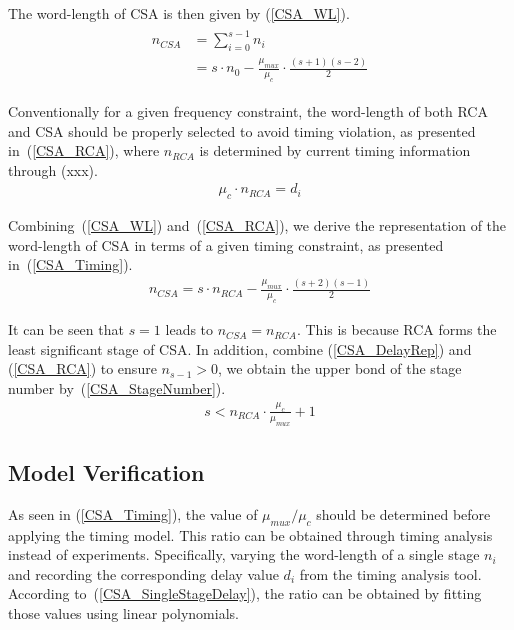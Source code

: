 \documentclass[journal]{IEEEtran}
\begin{document}
The word-length of CSA is then given by (\ref{CSA_WL}).
\begin{eqnarray}\label{CSA_WL}
  \begin{split}
    n_{CSA} &=\sum_{i=0}^{s-1}n_{i} \\
    &= s\cdot n_{0}-\frac{\mu_{mux}}{\mu_{c}}\cdot\frac{(s+1)(s-2)}{2}
  \end{split}
\end{eqnarray}

Conventionally for a given frequency constraint, the word-length of both RCA and CSA should be properly selected to avoid timing violation, as presented in~(\ref{CSA_RCA}), where $n_{RCA}$ is determined by current timing information through (xxx).
\begin{eqnarray}\label{CSA_RCA}
  \mu_{c}\cdot n_{RCA}=d_i
\end{eqnarray}

Combining~(\ref{CSA_WL}) and~(\ref{CSA_RCA}), we derive the representation of the word-length of CSA in terms of a given timing constraint, as presented in~(\ref{CSA_Timing}).
\begin{eqnarray}\label{CSA_Timing}
  n_{CSA}=s\cdot n_{RCA}-\frac{\mu_{mux}}{\mu_{c}}\cdot\frac{(s+2)(s-1)}{2}
\end{eqnarray}

It can be seen that $s=1$ leads to $n_{CSA}=n_{RCA}$. This is because RCA forms the least significant stage of CSA. In addition, combine (\ref{CSA_DelayRep}) and (\ref{CSA_RCA}) to ensure $n_{s-1}>0$, we obtain the upper bond of the stage number by~(\ref{CSA_StageNumber}).
\begin{eqnarray}\label{CSA_StageNumber}
  s<n_{RCA}\cdot\frac{\mu_c}{\mu_{mux}}+1
\end{eqnarray}

\subsection{Model Verification}
As seen in (\ref{CSA_Timing}), the value of $\mu_{mux}/\mu_c$ should be determined before applying the timing model. This ratio can be obtained through timing analysis instead of experiments. Specifically, varying the word-length of a single stage $n_i$ and recording the corresponding delay value $d_i$ from the timing analysis tool. According to~(\ref{CSA_SingleStageDelay}), the ratio can be obtained by fitting those values using linear polynomials.
\end{document}
